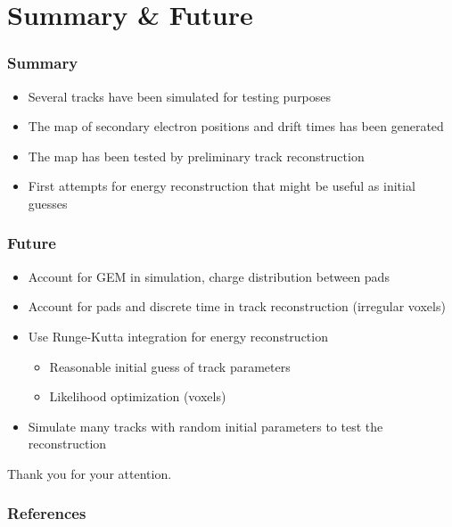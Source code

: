 \documentclass{beamer}
\begin{document}
	\section{Summary \& Future}	
	\begin{frame}
		\frametitle{Summary}
		\begin{itemize}
			\item Several tracks have been simulated for testing purposes
			\item The map of secondary electron positions and drift times has been generated
			\item The map has been tested by preliminary track reconstruction
			\item First attempts for energy reconstruction that might be useful as initial guesses
		\end{itemize}
	\end{frame}
	\begin{frame}
		\frametitle{Future}
		\begin{itemize}
			\item Account for GEM in simulation, charge distribution between pads
			\item Account for pads and discrete time in track reconstruction (irregular voxels)
			\item Use Runge-Kutta integration for energy reconstruction
				\begin{itemize}
					\item Reasonable initial guess of track parameters
					\item Likelihood optimization (voxels)
				\end{itemize}
			\item Simulate many tracks with random initial parameters to test the reconstruction
		\end{itemize}
	\end{frame}
	
	{
		\begin{frame}[noframenumbering]{}
			\begin{center}
				\Huge Thank you for your attention.
			\end{center}
		\end{frame}
	}
	
	\begin{frame}
		\frametitle{References}
		
		
	\end{frame}
	
\end{document}
